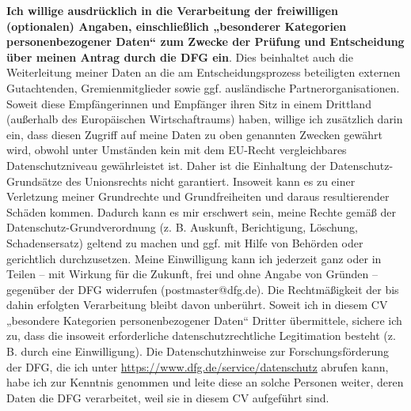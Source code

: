 \documentclass[11pt]{article}
\begin{document}
\noindent
\textbf{Ich willige ausdrücklich in die Verarbeitung der freiwilligen
(optionalen) Angaben, einschließlich „besonderer Kategorien
personenbezogener Daten“ zum Zwecke der Prüfung und Entscheidung über
meinen Antrag durch die DFG ein}. Dies beinhaltet auch die
Weiterleitung meiner Daten an die am Entscheidungsprozess beteiligten
externen Gutachtenden, Gremienmitglieder sowie ggf. ausländische
Partnerorganisationen. Soweit diese Empfängerinnen und Empfänger ihren
Sitz in einem Drittland (außerhalb des Europäischen Wirtschaftraums)
haben, willige ich zusätzlich darin ein, dass diesen Zugriff auf meine
Daten zu oben genannten Zwecken gewährt wird, obwohl unter Umständen
kein mit dem EU-Recht vergleichbares Datenschutzniveau gewährleistet
ist. Daher ist die Einhaltung der Datenschutz-Grundsätze des
Unionsrechts nicht garantiert. Insoweit kann es zu einer Verletzung
meiner Grundrechte und Grundfreiheiten und daraus resultierender
Schäden kommen. Dadurch kann es mir erschwert sein, meine Rechte gemäß
der Datenschutz-Grundverordnung (z. B. Auskunft, Berichtigung,
Löschung, Schadensersatz) geltend zu machen und ggf. mit Hilfe von
Behörden oder gerichtlich durchzusetzen.
%
Meine Einwilligung kann ich jederzeit ganz oder in Teilen – mit
Wirkung für die Zukunft, frei und ohne Angabe von Gründen – gegenüber
der DFG widerrufen (postmaster@dfg.de). Die Rechtmäßigkeit der bis
dahin erfolgten Verarbeitung bleibt davon unberührt. Soweit ich in
diesem CV „besondere Kategorien personenbezogener Daten“ Dritter
übermittele, sichere ich zu, dass die insoweit erforderliche
datenschutzrechtliche Legitimation besteht (z. B. durch eine
Einwilligung).
%
Die Datenschutzhinweise zur Forschungsförderung der DFG, die ich unter
\url{https://www.dfg.de/service/datenschutz} abrufen kann, habe ich
zur Kenntnis genommen und leite diese an solche Personen weiter, deren
Daten die DFG verarbeitet, weil sie in diesem CV aufgeführt sind.

\end{document}
